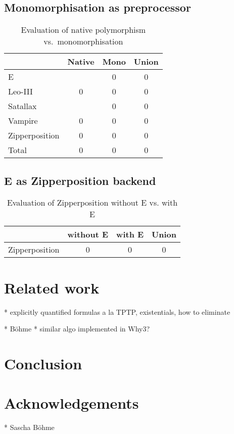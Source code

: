 \documentclass[]{ceurart}
\begin{document}
\subsection{Monomorphisation as preprocessor}

\begin{table}[ht]
\caption{Evaluation of native polymorphism vs.\ monomorphisation}
\centering\begin{tabular}{@{}lccc@{}}
   \toprule
   & Native & Mono & Union \\
   \midrule
   E  &   & 0 & 0 \\
   Leo-III & 0 & 0 & 0 \\
   Satallax &  & 0 & 0 \\
   Vampire & 0 & 0 & 0 \\
   Zipperposition & 0 & 0 & 0 \\[1.5\jot]
   Total & 0 & 0 & 0 \\
   \bottomrule
\end{tabular}
\end{table}

\subsection{E as Zipperposition backend}

\begin{table}[ht]
\caption{Evaluation of Zipperposition without E vs. with E}
\centering\begin{tabular}{@{}lccc@{}}
   \toprule
   & without E & with E & Union \\
   \midrule
   Zipperposition & 0 & 0 & 0 \\
   \bottomrule
\end{tabular}
\end{table}

\break

\section{Related work}
\label{sec:related-work}

  * explicitly quantified formulas a la TPTP, existentials, how to eliminate

  * Böhme
  * similar algo implemented in Why3?

\section{Conclusion}
\label{sec:conclusion}



\section*{Acknowledgements}

* Sascha Böhme


\end{document}
